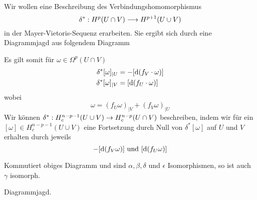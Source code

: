 Wir wollen eine Beschreibung des Verbindungshomomorphismus
\[ \delta^* : H^p(U\cap V) \overset{}{\longrightarrow} H^{p+1}(U\cup V) \]
in der Mayer-Vietoris-Sequenz erarbeiten. Sie ergibt sich durch eine Diagrammjagd aus folgendem Diagramm
\begin{center}
\end{center}
Es gilt somit für $\omega \in \Omega^p(U\cap V)$
\begin{align*}
\delta^*[\omega]_{|U} &= - [\text{d} (f_V \cdot \omega)]\\
\delta^*[\omega]_{|V} &= [\text{d} (f_U \cdot \omega)]
\end{align*}
wobei
\[ \omega = (f_U\omega)_{|V} + (f_V \omega)_{|U} \]
Wir können $\delta^*: H^{n-p-1}_c(U\cup V) \overset{}{\rightarrow} H^{n-p}_c(U\cap V)$ beschreiben, indem wir für ein
$[\omega] \in H^{n-p-1}_c(U\cup V)$ eine Fortsetzung durch Null von $\delta^*[\omega]$ auf $U$ und $V$ erhalten durch jeweils
\[ -[\text{d} (f_V\omega)] \text{  und  } [\text{d} (f_U \omega)] \]

\begin{center}
\end{center}
Kommutiert obiges Diagramm und sind $\alpha, \beta, \delta$ und $\epsilon$ Isomorphismen, so ist auch $\gamma$ isomorph.
\begin{Beweis}{}
	Diagrammjagd.
\end{Beweis}

